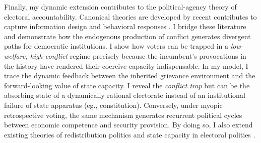 \documentclass[11pt,twoside]{extarticle}
\begin{document}


Finally, my dynamic extension contributes to the political-agency theory of electoral accountability. Canonical theories \citep*{barroControlPoliticiansEconomic1973,ferejohnIncumbentPerformanceElectoral1986} are developed by recent contributes to capture information design \citep*{banksRepeatedElectionsModel1993,przeworskiDemocracyAccountabilityRepresentation1999,sandroniWhenConfrontRole2018a,acharyaPoliticalAccountabilityMoral2025} and behavioral responses \citep*{levyCorrelationNeglectVoting2015,ortolevaOverconfidencePoliticalBehavior2015,liElectoralAccountabilitySelection2023,vaethVoterLearningUnidimensional2023}. I bridge these literature and demonstrate how the endogenous production of conflict generates divergent paths for democratic institutions. I show how voters can be trapped in a \emph{low-welfare, high-conflict} regime precisely because the incumbent's provocations in the history have rendered their coercive capacity indispensable. In my model, I trace the dynamic feedback between the inherited grievance environment and the forward-looking value of state capacity. I reveal the \emph{conflict trap} but can be the absorbing state of a dynamically rational electorate instead of an institutional failure of state apparatus (eg., constitution). Conversely, under myopic retrospective voting, the same mechanism generates recurrent political cycles between economic competence and security provision. By doing so, I also extend existing theories of redistribution politics and state capacity in electoral polities \citep*{alesinaPoliticsBusinessCycles1989,coatePolicyPersistence1999,besleyOriginsStateCapacity2009,besleyStateCapacityConflict2010}. 






\end{document}
